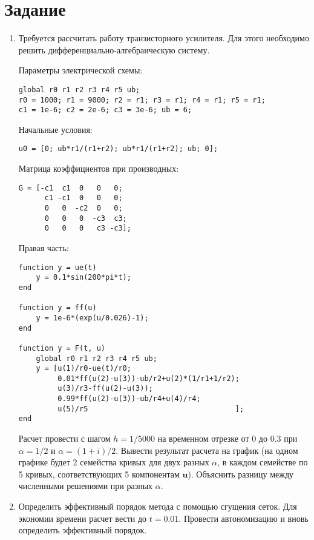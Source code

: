 \section{Задание}
\begin{enumerate}
\item Требуется рассчитать работу транзисторного усилителя. Для этого необходимо решить дифференциально-алгебраическую систему.

Параметры электрической схемы:
\begin{matlablisting}
	\begin{lstlisting}
global r0 r1 r2 r3 r4 r5 ub;
r0 = 1000; r1 = 9000; r2 = r1; r3 = r1; r4 = r1; r5 = r1;
c1 = 1e-6; c2 = 2e-6; c3 = 3e-6; ub = 6;
	\end{lstlisting}
\end{matlablisting}
Начальные условия:
\begin{matlablisting}
	\begin{lstlisting}
u0 = [0; ub*r1/(r1+r2); ub*r1/(r1+r2); ub; 0];
	\end{lstlisting}
\end{matlablisting}
Матрица коэффициентов при производных:
\begin{matlablisting}
	\begin{lstlisting}
G = [-c1  c1  0   0   0;
      c1 -c1  0   0   0;
      0   0  -c2  0   0;
      0   0   0  -c3  c3;
      0   0   0   c3 -c3];
	\end{lstlisting}
\end{matlablisting}
Правая часть:
\begin{matlablisting}
	\begin{lstlisting}
function y = ue(t)
    y = 0.1*sin(200*pi*t);
end

function y = ff(u)
    y = 1e-6*(exp(u/0.026)-1);
end

function y = F(t, u)
    global r0 r1 r2 r3 r4 r5 ub;
    y = [u(1)/r0-ue(t)/r0; 
         0.01*ff(u(2)-u(3))-ub/r2+u(2)*(1/r1+1/r2);
         u(3)/r3-ff(u(2)-u(3)); 
         0.99*ff(u(2)-u(3))-ub/r4+u(4)/r4; 
         u(5)/r5                                  ];
end
	\end{lstlisting}
\end{matlablisting}
Расчет провести с шагом $h = 1/5000$ на временном отрезке от 0 до 0.3 при $\alpha = 1/2$ и $\alpha = (1+i)/2$. Вывести результат расчета на график (на одном графике будет 2 семейства кривых для двух разных $\alpha$, в каждом семействе по 5 кривых, соответствующих 5 компонентам $\mathbf{u}$). Объяснить разницу между численными решениями при разных $\alpha$.
\item Определить  эффективный порядок метода с помощью сгущения сеток. Для экономии времени расчет вести до $t = 0.01$. Провести автономизацию и вновь определить эффективный порядок.
\end{enumerate}